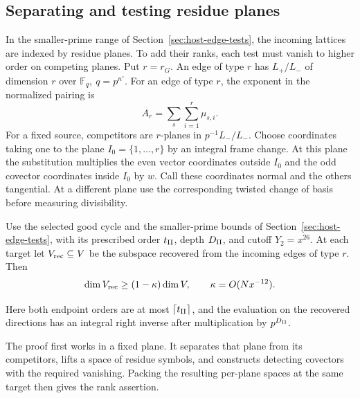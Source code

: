 \subsection{Separating and testing residue planes}
\label{sec:plane-lifts}
\hypertarget{source-plane-lifts}{}

In the smaller-prime range of Section~\ref{sec:host-edge-tests}, the incoming lattices are indexed by residue planes. To add their ranks, each test must vanish to higher order on competing planes. Put \(r=r_G\).
An edge of type \(r\) has \(L_+/L_-\) of dimension \(r\) over
\(\mathbb F_q,\ q=p^{n'}\). For an edge of type \(r\), the exponent in the normalized pairing is
\[
                   A_r=\sum_s\sum_{i=1}^r\mu_{s,i}.
\] For a fixed source, competitors are
\(r\)-planes in \(p^{-1}L_-/L_-\). Choose coordinates taking one to the plane \(I_0=\{1,\ldots,r\}\) by an integral frame change.
At this plane the substitution multiplies the even vector
coordinates outside \(I_0\) and the odd covector coordinates
inside \(I_0\) by \(w\). Call these coordinates normal and the
others tangential. At a different plane use the corresponding
twisted change of basis before measuring divisibility.

\begin{proposition}\label{prop:residue-plane-neighbor-test}
Use the selected good cycle and the smaller-prime bounds of
Section~\ref{sec:host-edge-tests}, with its prescribed order
\(t_{\rm II}\), depth \(D_{\rm II}\), and cutoff
\(Y_2=x^{26}\). At each target let \(V_{\rm rec}\subseteq V\) be the subspace recovered from the incoming edges of type \(r\). Then
\[
 \dim V_{\rm rec}\ge(1-\kappa)\dim V,\qquad\kappa=O(Nx^{-12}).
\]

Here both endpoint orders are at most
\(\lceil t_{\rm II}\rceil\), and the evaluation on the recovered
directions has an integral right inverse after multiplication
by \(p^{D_{\rm II}}\).
\end{proposition}

The proof first works in a fixed plane. It separates that plane
from its competitors, lifts a space of residue symbols, and
constructs detecting covectors with the required vanishing.
Packing the resulting per-plane spaces at the same target
then gives the rank assertion.

